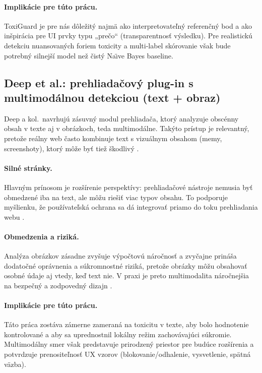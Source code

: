 \paragraph{Implikácie pre túto prácu.}
ToxiGuard je pre nás dôležitý najmä ako interpretovateľný referenčný bod a ako inšpirácia pre UI prvky typu „prečo“ (transparentnosť výsledku). Pre realistickú detekciu nuansovaných foriem toxicity a multi-label skórovanie však bude potrebný silnejší model než čistý Na\"{\i}ve Bayes baseline.

\subsection{Deep et al.: prehliadačový plug-in s multimodálnou detekciou (text + obraz)}\label{subsec:deep_related}
Deep a kol.\ navrhujú zásuvný modul prehliadača, ktorý analyzuje obscénny obsah v texte aj v obrázkoch, teda multimodálne. Takýto prístup je relevantný, pretože reálny web často kombinuje text s vizuálnym obsahom (memy, screenshoty), ktorý môže byť tiež škodlivý \cite{deep2024integrated}.

\paragraph{Silné stránky.}
Hlavným prínosom je rozšírenie perspektívy: prehliadačové nástroje nemusia byť obmedzené iba na text, ale môžu riešiť viac typov obsahu. To podporuje myšlienku, že používateľská ochrana sa dá integrovať priamo do toku prehliadania webu \cite{deep2024integrated}.

\paragraph{Obmedzenia a riziká.}
Analýza obrázkov zásadne zvyšuje výpočtovú náročnosť a zvyčajne prináša dodatočné oprávnenia a súkromnostné riziká, pretože obrázky môžu obsahovať osobné údaje aj vtedy, keď text nie. V praxi je preto multimodalita náročnejšia na bezpečný a zodpovedný dizajn \cite{deep2024integrated}.

\paragraph{Implikácie pre túto prácu.}
Táto práca zostáva zámerne zameraná na toxicitu v texte, aby bolo hodnotenie kontrolované a aby sa uprednostnil lokálny režim zachovávajúci súkromie. Multimodálny smer však predstavuje prirodzený priestor pre budúce rozšírenia a potvrdzuje prenositeľnosť UX vzorov (blokovanie/odhalenie, vysvetlenie, spätná väzba).

